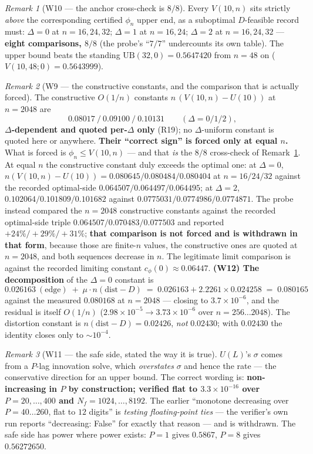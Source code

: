 \documentclass[11pt]{article}
\theoremstyle{definition}
\theoremstyle{remark}
\newtheorem{remark}{Remark}
\begin{document}
\begin{remark}[W10 --- the anchor cross-check is $8/8$]
\label{rem:W10}
Every $V(10,n)$ sits strictly \emph{above} the corresponding certified
$\phi_n$ upper end, as a suboptimal $D$-feasible record must:
$\Delta=0$ at $n=16,24,32$; $\Delta=1$ at $n=16,24$; $\Delta=2$ at
$n=16,24,32$ --- \textbf{eight comparisons, $8/8$} (the probe's ``$7/7$''
undercounts its own table). The upper bound beats the standing
$\mathrm{UB}(32,0)=0.5647420$ from $n=48$ on ($V(10,48;0)=0.5643999$).
\end{remark}

\begin{remark}[W9 --- the constructive constants, and the comparison that is
actually forced]
\label{rem:W9}
The constructive $O(1/n)$ constants $n\,(V(10,n)-U(10))$ at $n=2048$ are
\[
0.08017\ /\ 0.09100\ /\ 0.10131\qquad(\Delta=0/1/2),
\]
\textbf{$\Delta$-dependent and quoted per-$\Delta$ only} (R19); no
$\Delta$-uniform constant is quoted here or anywhere.
\textbf{Their ``correct sign'' is forced only at equal $n$.} What is forced is
$\phi_n\le V(10,n)$ --- and that \emph{is} the $8/8$ cross-check of
Remark~\ref{rem:W10}. At equal $n$ the constructive constant duly exceeds the
optimal one: at $\Delta=0$, $n(V(10,n)-U(10))=0.080645/0.080484/0.080404$ at
$n=16/24/32$ against the recorded optimal-side $0.064507/0.064497/0.064495$;
at $\Delta=2$, $0.102064/0.101809/0.101682$ against
$0.0775031/0.0774986/0.0774871$. The probe instead compared the $n=2048$
constructive constants against the recorded optimal-side triple
$0.064507/0.070483/0.077503$ and reported $+24\%/+29\%/+31\%$;
\textbf{that comparison is not forced and is withdrawn in that form},
because those are finite-$n$ values, the constructive ones are quoted at
$n=2048$, and both sequences decrease in $n$. The legitimate limit comparison
is against the recorded limiting constant $c_\phi(0)\approx0.06447$.
\textbf{(W12) The decomposition} of the $\Delta=0$ constant is
\[
0.026163\ (\text{edge})\;+\;\mu\cdot n(\mathrm{dist}-D)
\;=\;0.026163+2.2261\times\mathbf{0.024258}\;=\;0.080165
\]
against the measured $0.080168$ at $n=2048$ --- closing to
$3.7\times10^{-6}$, and the residual is itself $O(1/n)$
($2.98\times10^{-5}\to3.73\times10^{-6}$ over $n=256\ldots2048$). The
distortion constant is $n(\mathrm{dist}-D)=0.02426$, \emph{not} $0.02430$;
with $0.02430$ the identity closes only to $\sim10^{-4}$.
\end{remark}

\begin{remark}[W11 --- the safe side, stated the way it is true]
\label{rem:W11}
$U(L)$'s $\sigma$ comes from a $P$-lag innovation solve, which \emph{overstates}
$\sigma$ and hence the rate --- the conservative direction for an upper bound.
The correct wording is: \textbf{non-increasing in $P$ by construction; verified
flat to $3.3\times10^{-16}$ over $P=20,\dots,400$ and
$N_f=1024,\dots,8192$}. The earlier ``monotone decreasing over $P=40\ldots260$,
flat to $12$ digits'' is \emph{testing floating-point ties} --- the verifier's
own run reports ``decreasing: False'' for exactly that reason --- and is
withdrawn. The safe side has power where power exists: $P=1$ gives $0.5867$,
$P=8$ gives $0.56272650$.
\end{remark}
\end{document}
